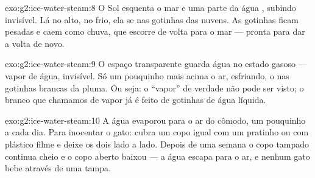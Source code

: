 \begin{solution}{exo:g2:ice-water-steam:8}
O Sol esquenta o mar e uma parte da água , subindo invisível.
Lá no alto, no frio, ela se  nas gotinhas das nuvens. As
gotinhas ficam pesadas e caem como chuva, que escorre de volta para o
mar --- pronta para dar a volta de novo.
\end{solution}

\begin{solution}{exo:g2:ice-water-steam:9}
O espaço transparente guarda água no estado gasoso --- vapor de água,
invisível. Só um pouquinho mais acima o ar, esfriando, o  nas
gotinhas brancas da pluma. Ou seja: o ``vapor'' de verdade não pode
ser visto; o branco que chamamos de vapor já é feito de gotinhas de
água líquida.
\end{solution}

\begin{solution}{exo:g2:ice-water-steam:10}
A água evaporou para o ar do cômodo, um pouquinho a cada dia. Para
inocentar o gato: cubra um copo igual com um pratinho ou com plástico
filme e deixe os dois lado a lado. Depois de uma semana o copo tampado
continua cheio e o copo aberto baixou --- a água escapa para o ar, e
nenhum gato bebe através de uma tampa.
\end{solution}
